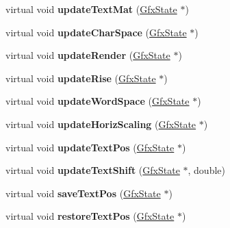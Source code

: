 \begin{DoxyCompactItemize}
virtual void {\bfseries update\+Text\+Mat} (\hyperlink{class_gfx_state}{Gfx\+State} $\ast$)
\item 
\mbox{\label{class_output_dev_a01168f564318064748a8a395229b700a}} 
virtual void {\bfseries update\+Char\+Space} (\hyperlink{class_gfx_state}{Gfx\+State} $\ast$)
\item 
\mbox{\label{class_output_dev_a6271d1ebd09c0a79eadba5c078949710}} 
virtual void {\bfseries update\+Render} (\hyperlink{class_gfx_state}{Gfx\+State} $\ast$)
\item 
\mbox{\label{class_output_dev_ac6105a80a144bb1653d5822580ff2063}} 
virtual void {\bfseries update\+Rise} (\hyperlink{class_gfx_state}{Gfx\+State} $\ast$)
\item 
\mbox{\label{class_output_dev_a624caf1670d8bd6ea47c81f176799400}} 
virtual void {\bfseries update\+Word\+Space} (\hyperlink{class_gfx_state}{Gfx\+State} $\ast$)
\item 
\mbox{\label{class_output_dev_aa8200b0a5cf6e5258bcd8973286d7cb3}} 
virtual void {\bfseries update\+Horiz\+Scaling} (\hyperlink{class_gfx_state}{Gfx\+State} $\ast$)
\item 
\mbox{\label{class_output_dev_ac7171bda1b19bda650dd51addb7b19ba}} 
virtual void {\bfseries update\+Text\+Pos} (\hyperlink{class_gfx_state}{Gfx\+State} $\ast$)
\item 
\mbox{\label{class_output_dev_aa24010d0b4f1304f565a24b8c3f4916d}} 
virtual void {\bfseries update\+Text\+Shift} (\hyperlink{class_gfx_state}{Gfx\+State} $\ast$, double)
\item 
\mbox{\label{class_output_dev_a528e180c891e750dd674ed938e2c2395}} 
virtual void {\bfseries save\+Text\+Pos} (\hyperlink{class_gfx_state}{Gfx\+State} $\ast$)
\item 
\mbox{\label{class_output_dev_a8f03af87f145a05913cc52e371d26702}} 
virtual void {\bfseries restore\+Text\+Pos} (\hyperlink{class_gfx_state}{Gfx\+State} $\ast$)
\item 
\mbox{\label{class_output_dev_aa24b70b1cff92053ef27c7e57f9c6e3a}} 

\end{DoxyCompactItemize}
